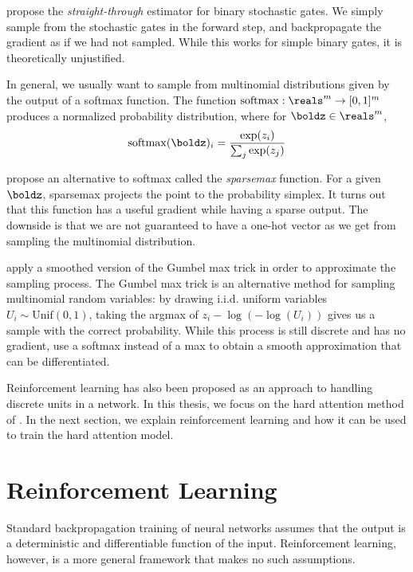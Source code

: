 \documentclass[11pt]{report}
\begin{document}
\citet{BengioLC13} propose the \emph{straight-through} estimator for binary stochastic gates. We simply sample from the stochastic gates in the forward step, and backpropagate the gradient as if we had not sampled. While this works for simple binary gates, it is theoretically unjustified.

In general, we usually want to sample from multinomial distributions given by the output of a softmax function. The function $\operatorname{softmax} : \reals^m \to [0,1]^m$ produces a normalized probability distribution, where for $\boldz \in \reals^m$,
\begin{equation}
\operatorname{softmax}(\boldz)_i = \frac{\exp(z_i)}{\sum_j \exp(z_j)}
\end{equation}

\citet{martins2016sparsemax} propose an alternative to softmax called the \emph{sparsemax} function. For a given $\boldz$, sparsemax projects the point to the probability simplex. It turns out that this function has a useful gradient while having a sparse output. The downside is that we are not guaranteed to have a one-hot vector as we get from sampling the multinomial distribution.

\citet{Maddison2017} apply a smoothed version of the Gumbel max trick in order to approximate the sampling process. The Gumbel max trick is an alternative method for sampling multinomial random variables: by drawing i.i.d. uniform variables $U_i \sim \mathrm{Unif}(0,1)$, taking the argmax of $z_i - \log(-\log(U_i))$ gives us a sample with the correct probability. While this process is still discrete and has no gradient, \citet{Maddison2017} use a softmax instead of a max to obtain a smooth approximation that can be differentiated.


Reinforcement learning has also been proposed as an approach to handling discrete units in a network. In this thesis, we focus on the hard attention method of \citet{xu2015captioning}. In the next section, we explain reinforcement learning and how it can be used to train the hard attention model.

\section{Reinforcement Learning}

Standard backpropagation training of neural networks assumes that the output is a deterministic and differentiable function of the input. Reinforcement learning, however, is a more general framework that makes no such assumptions.
\end{document}
